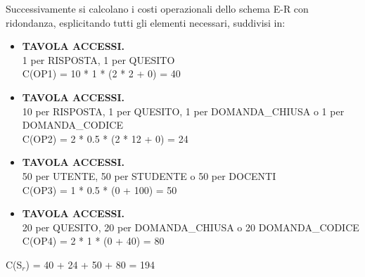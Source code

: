 \documentclass{article}
\begin{document}
Successivamente si calcolano i costi operazionali dello schema E-R con ridondanza, esplicitando tutti gli elementi necessari, suddivisi in:
\begin{itemize}[label={ }]
    \itemsep0em 
    \item {\small\textbf{TAVOLA ACCESSI.} \\ 1 per RISPOSTA, 1 per QUESITO} \vspace*{2pt}\\ C(OP1) = 10 * 1 * (2 * 2 + 0) = 40 \vspace*{2pt} 
    \item {\small\textbf{TAVOLA ACCESSI.} \\ 10 per RISPOSTA, 1 per QUESITO, 1 per DOMANDA\_CHIUSA o 1 per DOMANDA\_CODICE} \vspace*{2pt}\\ C(OP2) = 2 * 0.5 * (2 * 12 + 0) = 24 \vspace*{2pt}
    \item {\small\textbf{TAVOLA ACCESSI.} \\ 50 per UTENTE, 50 per STUDENTE o 50 per DOCENTI} \vspace*{2pt}\\ C(OP3) = 1 * 0.5 * (0 + 100) = 50
    \item {\small\textbf{TAVOLA ACCESSI.} \\ 20 per QUESITO, 20 per DOMANDA\_CHIUSA o 20 DOMANDA\_CODICE } \vspace*{1pt}\\ C(OP4) = 2 * 1 * (0 + 40) = 80
\end{itemize}
\hspace*{15pt}C(S$_r$) = 40 + 24 + 50 + 80 = 194
\end{document}
